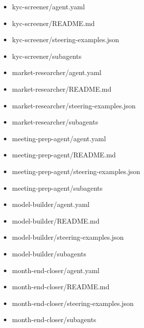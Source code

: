 \documentclass[11pt]{article}
\begin{document}
\begin{itemize}[leftmargin=*,itemsep=1pt,topsep=2pt]
\item \hspace*{0.9em}kyc-screener/agent.yaml
\item \hspace*{0.9em}kyc-screener/README.md
\item \hspace*{0.9em}kyc-screener/steering-examples.json
\item \hspace*{0.9em}kyc-screener/subagents
\item \hspace*{0.9em}market-researcher/agent.yaml
\item \hspace*{0.9em}market-researcher/README.md
\item \hspace*{0.9em}market-researcher/steering-examples.json
\item \hspace*{0.9em}market-researcher/subagents
\item \hspace*{0.9em}meeting-prep-agent/agent.yaml
\item \hspace*{0.9em}meeting-prep-agent/README.md
\item \hspace*{0.9em}meeting-prep-agent/steering-examples.json
\item \hspace*{0.9em}meeting-prep-agent/subagents
\item \hspace*{0.9em}model-builder/agent.yaml
\item \hspace*{0.9em}model-builder/README.md
\item \hspace*{0.9em}model-builder/steering-examples.json
\item \hspace*{0.9em}model-builder/subagents
\item \hspace*{0.9em}month-end-closer/agent.yaml
\item \hspace*{0.9em}month-end-closer/README.md
\item \hspace*{0.9em}month-end-closer/steering-examples.json
\item \hspace*{0.9em}month-end-closer/subagents

\end{itemize}
\end{document}

